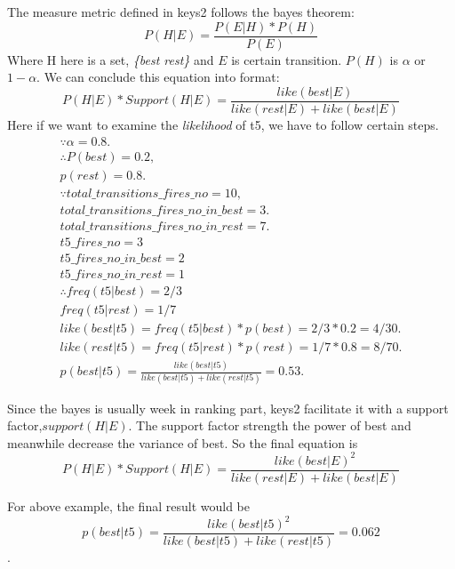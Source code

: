 \documentclass{sig-alternate}
\begin{document}
The measure metric defined in keys2 follows the bayes theorem:
\begin{equation*}
P(H|E) = \frac{P(E|H) * P(H) }{P(E)}
\end{equation*}
Where H here is a set, {\em \{best rest\}} and $E$ is certain transition.  $P(H)$ is $\alpha$ or $1- \alpha$. 
 We can conclude this equation into format:
 \begin{equation*}
 P(H|E)*Support(H|E) = \frac{like(best|E)}{like(rest | E)+ like(best|E)}
 \end{equation*}
Here if we want to examine the {\em likelihood} of t5, we have to follow certain steps. 
\begin{eqnarray*}
\because \alpha =0.8.  \\
\therefore P(best) = 0.2,\\
 p(rest) = 0.8.\\
\because
total\_transitions\_fires\_no =10,\\
total\_transitions\_fires\_no\_in\_best =3.\\
total\_transitions\_fires\_no\_in\_rest =7.\\
t5\_fires\_no=3\\
t5\_fires\_no\_in\_best=2\\
t5\_fires\_no\_in\_rest=1\\
\therefore
freq(t5| best) = 2/3\\
freq(t5 |rest) = 1/7\\
like(best | t5) = freq (t5 | best) * p(best) = 2/3 * 0.2 = 4/30.\\
like(rest | t5) = freq( t5 |rest) * p(rest) = 1/7 * 0.8 = 8/ 70. \\
p(best| t5) = \frac{like(best|t5)}{ like (best | t5) + like( rest | t5)} = 0.53.
\end{eqnarray*}

Since the bayes is usually week in ranking part, keys2 facilitate it with a support factor,$support(H|E)$. The support factor strength the power of best and meanwhile decrease the variance of best. So the final equation is 
\begin{equation*}
P(H|E)*Support(H|E) = \frac{like(best|E)^2}{like(rest | E)+ like(best|E)}
\end{equation*}

For above example, the final result would be 
\begin{equation*}
p(best| t5) = \frac{like(best|t5)^2}{ like (best | t5) + like( rest | t5)} = 0.062
\end{equation*}.
\end{document}
